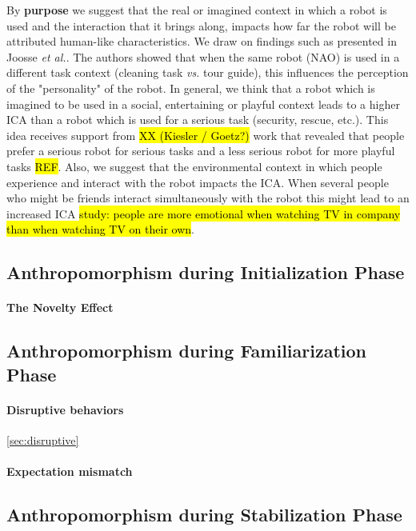 \documentclass[lettersize, apacite, twoside, HRI]{apa_HRI}
\begin{document}
    By \textbf{purpose} we suggest that the real or imagined context in which a robot is used and the interaction that it brings along, impacts how far the robot will be attributed human-like characteristics. We	draw on findings such as presented in Joosse \textit{et al.}. The authors showed that when the same robot (NAO) is used in a different task context (cleaning task \textit{vs.} tour guide), this influences the perception of the "personality" of the robot. In general, we think that a robot which is imagined to be used in a social, entertaining or playful context leads to a higher ICA than a robot which is used for a serious task (security, rescue, etc.). This idea receives support from \hl{XX (Kiesler / Goetz?)} work that revealed that people prefer a serious robot for serious tasks and a less serious robot for more playful tasks \hl{REF}. Also, we suggest that the environmental context in which people experience and interact with the robot impacts the ICA. When several people who might be friends interact simultaneously with the robot this might lead to an increased ICA \hl{study: people are more emotional when watching TV in company than when watching TV on their own}.

\subsection{Anthropomorphism during Initialization Phase}
\label{sec:initialization}

\paragraph{The Novelty Effect}
\label{sec:noveltyeffect}

\subsection{Anthropomorphism during Familiarization Phase}
\label{sec:familiarization}

\paragraph{Disruptive behaviors}
\ref{sec:disruptive}

\paragraph{Expectation mismatch}

\subsection{Anthropomorphism during Stabilization Phase}
\label{sec:stabilization}
\end{document}
